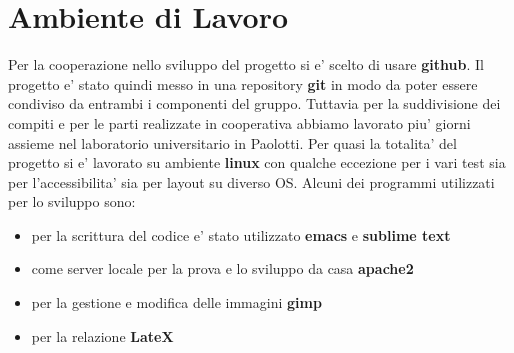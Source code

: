 \section{Ambiente di Lavoro}

Per la cooperazione nello sviluppo del progetto si e' scelto di usare \textbf{github}. 
Il progetto e' stato quindi messo in una repository \textbf{git} in modo da poter essere condiviso da entrambi i componenti del gruppo.
Tuttavia per la suddivisione dei compiti e per le parti realizzate in cooperativa abbiamo lavorato piu' giorni assieme nel laboratorio universitario in Paolotti.
Per quasi la totalita' del progetto si e' lavorato su ambiente \textbf{linux} con qualche eccezione per i vari test sia per l'accessibilita' sia per layout su diverso OS.
Alcuni dei programmi utilizzati per lo sviluppo sono:
\begin{itemize}
	\item	per la scrittura del codice e' stato utilizzato \textbf{emacs} e \textbf{sublime text}
	\item come server locale per la prova e lo sviluppo da casa \textbf{apache2}
	\item per la gestione e modifica delle immagini \textbf{gimp}
	\item per la relazione \textbf{LateX}
\end{itemize}
